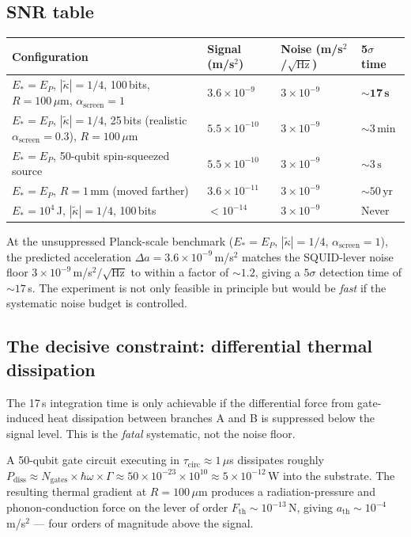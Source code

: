\documentclass[11pt,letterpaper]{article}
\newcommand{\kt}{\tilde{\kappa}}
\newcommand{\asc}{\alpha_{\mathrm{screen}}}
\begin{document}
\subsection{SNR table}

\begin{center}\small
\begin{tabular}{@{}p{5.5cm}p{2cm}p{2cm}p{2.5cm}@{}}
\toprule
Configuration & Signal (m/s$^2$) & Noise (m/s$^2$/$\sqrt{\text{Hz}}$) & 5$\sigma$ time \\
\midrule
$E_*=E_P$, $|\kt|=1/4$, 100\,bits, $R=100\,\mu$m, $\asc=1$ &
$3.6\times10^{-9}$ & $3\times10^{-9}$ & $\mathbf{\sim 17\,\text{s}}$ \\
$E_*=E_P$, $|\kt|=1/4$, 25\,bits (realistic $\asc=0.3$), $R=100\,\mu$m &
$5.5\times10^{-10}$ & $3\times10^{-9}$ & $\sim 3\,\text{min}$ \\
$E_*=E_P$, 50-qubit spin-squeezed source &
$5.5\times10^{-10}$ & $3\times10^{-9}$ & $\sim 3\,\text{s}$ \\
$E_*=E_P$, $R=1$\,mm (moved farther) &
$3.6\times10^{-11}$ & $3\times10^{-9}$ & $\sim 50\,\text{yr}$ \\
$E_*=10^4$\,J, $|\kt|=1/4$, 100\,bits &
$<10^{-14}$ & $3\times10^{-9}$ & Never \\
\bottomrule
\end{tabular}
\end{center}

\begin{keyresult}
At the unsuppressed Planck-scale benchmark ($E_* = E_P$, $|\kt| = 1/4$, $\asc = 1$),
the predicted acceleration $\Delta a = 3.6\times10^{-9}$\,m/s$^2$ matches the SQUID-lever
noise floor $3\times10^{-9}$\,m/s$^2/\sqrt{\text{Hz}}$ to within a factor of $\sim 1.2$,
giving a $5\sigma$ detection time of $\sim 17$\,s.  The experiment is not only feasible
in principle but would be \emph{fast} if the systematic noise budget is controlled.
\end{keyresult}

\subsection{The decisive constraint: differential thermal dissipation}

The 17\,s integration time is only achievable if the differential force from
gate-induced heat dissipation between branches A and B is suppressed below the
signal level.  This is the \emph{fatal} systematic, not the noise floor.

A 50-qubit gate circuit executing in $\tau_{\mathrm{circ}} \approx 1\,\mu$s dissipates
roughly $P_{\mathrm{diss}} \approx N_{\mathrm{gates}}\times\hbar\omega\times\Gamma
\approx 50\times10^{-23}\times10^{10} \approx 5\times10^{-12}$\,W into the substrate.
The resulting thermal gradient at $R = 100\,\mu$m produces a radiation-pressure
and phonon-conduction force on the lever of order $F_{\mathrm{th}} \sim 10^{-13}$\,N,
giving $a_{\mathrm{th}} \sim 10^{-4}$\,m/s$^2$ --- four orders of magnitude above
the signal.
\end{document}
